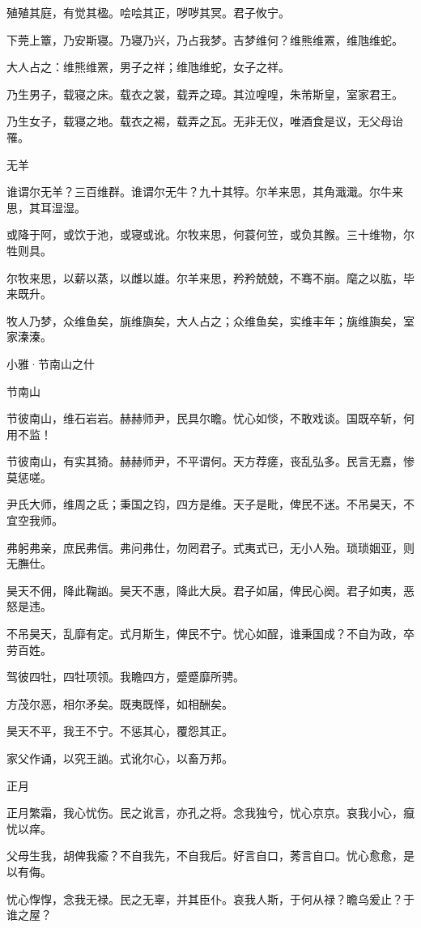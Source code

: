 殖殖其庭，有觉其楹。哙哙其正，哕哕其冥。君子攸宁。

下莞上簟，乃安斯寝。乃寝乃兴，乃占我梦。吉梦维何？维熊维罴，维虺维蛇。

大人占之：维熊维罴，男子之祥；维虺维蛇，女子之祥。

乃生男子，载寝之床。载衣之裳，载弄之璋。其泣喤喤，朱芾斯皇，室家君王。

乃生女子，载寝之地。载衣之裼，载弄之瓦。无非无仪，唯酒食是议，无父母诒罹。

无羊

谁谓尔无羊？三百维群。谁谓尔无牛？九十其犉。尔羊来思，其角濈濈。尔牛来思，其耳湿湿。

或降于阿，或饮于池，或寝或讹。尔牧来思，何蓑何笠，或负其餱。三十维物，尔牲则具。

尔牧来思，以薪以蒸，以雌以雄。尔羊来思，矜矜兢兢，不骞不崩。麾之以肱，毕来既升。

牧人乃梦，众维鱼矣，旐维旟矣，大人占之；众维鱼矣，实维丰年；旐维旟矣，室家溱溱。




小雅·节南山之什


节南山

节彼南山，维石岩岩。赫赫师尹，民具尔瞻。忧心如惔，不敢戏谈。国既卒斩，何用不监！

节彼南山，有实其猗。赫赫师尹，不平谓何。天方荐瘥，丧乱弘多。民言无嘉，惨莫惩嗟。

尹氏大师，维周之氐；秉国之钧，四方是维。天子是毗，俾民不迷。不吊昊天，不宜空我师。

弗躬弗亲，庶民弗信。弗问弗仕，勿罔君子。式夷式已，无小人殆。琐琐姻亚，则无膴仕。

昊天不佣，降此鞠訩。昊天不惠，降此大戾。君子如届，俾民心阕。君子如夷，恶怒是违。

不吊昊天，乱靡有定。式月斯生，俾民不宁。忧心如酲，谁秉国成？不自为政，卒劳百姓。

驾彼四牡，四牡项领。我瞻四方，蹙蹙靡所骋。

方茂尔恶，相尔矛矣。既夷既怿，如相酬矣。

昊天不平，我王不宁。不惩其心，覆怨其正。

家父作诵，以究王訩。式讹尔心，以畜万邦。

正月

正月繁霜，我心忧伤。民之讹言，亦孔之将。念我独兮，忧心京京。哀我小心，癙忧以痒。

父母生我，胡俾我瘉？不自我先，不自我后。好言自口，莠言自口。忧心愈愈，是以有侮。

忧心惸惸，念我无禄。民之无辜，并其臣仆。哀我人斯，于何从禄？瞻乌爰止？于谁之屋？

